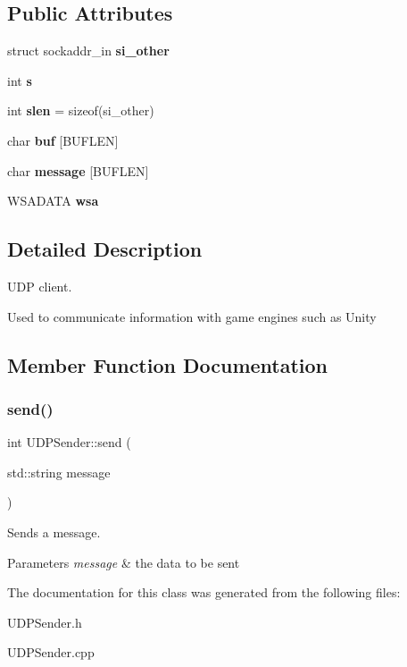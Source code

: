 \subsection*{Public Attributes}
\begin{DoxyCompactItemize}
\item 
\hypertarget{class_u_d_p_sender_abeda008425d14ea8092d23d23bbd1117}{}\label{class_u_d_p_sender_abeda008425d14ea8092d23d23bbd1117} 
struct sockaddr\+\_\+in {\bfseries si\+\_\+other}
\item 
\hypertarget{class_u_d_p_sender_aeb3773ffb3bc9549dbe73c0e7fee0f23}{}\label{class_u_d_p_sender_aeb3773ffb3bc9549dbe73c0e7fee0f23} 
int {\bfseries s}
\item 
\hypertarget{class_u_d_p_sender_a44e4545b002409e774edb7e30653d53e}{}\label{class_u_d_p_sender_a44e4545b002409e774edb7e30653d53e} 
int {\bfseries slen} = sizeof(si\+\_\+other)
\item 
\hypertarget{class_u_d_p_sender_a21073b873007a83ac5bec30bcce8fd43}{}\label{class_u_d_p_sender_a21073b873007a83ac5bec30bcce8fd43} 
char {\bfseries buf} \mbox{[}B\+U\+F\+L\+EN\mbox{]}
\item 
\hypertarget{class_u_d_p_sender_a738a29b72c2c7fe5655e74cd4ee0e077}{}\label{class_u_d_p_sender_a738a29b72c2c7fe5655e74cd4ee0e077} 
char {\bfseries message} \mbox{[}B\+U\+F\+L\+EN\mbox{]}
\item 
\hypertarget{class_u_d_p_sender_afc9fc0d12ba056af8f66ee738c5bbe98}{}\label{class_u_d_p_sender_afc9fc0d12ba056af8f66ee738c5bbe98} 
W\+S\+A\+D\+A\+TA {\bfseries wsa}
\end{DoxyCompactItemize}


\subsection{Detailed Description}
U\+DP client. 

Used to communicate information with game engines such as Unity 

\subsection{Member Function Documentation}
\hypertarget{class_u_d_p_sender_a33d402a42a2d512bd12189e1f698cca4}{}\label{class_u_d_p_sender_a33d402a42a2d512bd12189e1f698cca4} 
\subsubsection{\texorpdfstring{send()}{send()}}
{\footnotesize\ttfamily int U\+D\+P\+Sender\+::send (\begin{DoxyParamCaption}\item[{std\+::string}]{message }\end{DoxyParamCaption})}



Sends a message. 


\begin{DoxyParams}{Parameters}
{\em message} & the data to be sent \\
\hline
\end{DoxyParams}


The documentation for this class was generated from the following files\+:\begin{DoxyCompactItemize}
\item 
U\+D\+P\+Sender.\+h\item 
U\+D\+P\+Sender.\+cpp\end{DoxyCompactItemize}
